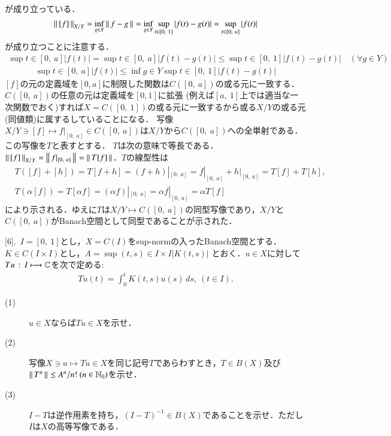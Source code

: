 \begin{prf}
\begin{description}
\begin{align}
		\end{align}
		が成り立っている．
		\begin{align}
			\left\|\, [f]\, \right\|_{X/Y} = \operatorname*{inf}_{g \in Y} \left\|\, f - g\, \right\|_{} = \operatorname*{inf}_{g \in Y} \operatorname*{sup}_{t \in [0,\ 1]} |f(t) - g(t)| = \operatorname*{sup}_{t \in [0,\ a]} |f(t)|
		\end{align}
		が成り立つことに注意する．
		\begin{align}
			\sup{t \in [0,\ a]}{|f(t)|} = \sup{t \in [0,\ a]}{|f(t) - g(t)|} \leq \sup{t \in [0,\ 1]}{|f(t) - g(t)|}\quad (\forall g \in Y)
		\end{align}
		\begin{align}
			\sup{t \in [0,\ a]}{|f(t)|} \leq \inf{g \in Y}{\sup{t \in [0,\ 1]}{|f(t) - g(t)|}}
		\end{align}
		$[f]$の元の定義域を$[0,a]$に制限した関数は$C([0,\ a])$の或る元に一致する．$C([0,\ a])$の任意の元は定義域を$[0,1]$に拡張
		(例えば$[a,\ 1]$上では適当な一次関数でおく)すれば$X=C([0,\ 1])$の或る元に一致するから或る$X/Y$の或る元(同値類)に属するしていることになる．
		写像$X/Y \ni [f] \longmapsto f|_{[0,\ a]} \in C([0,\ a])$は$X/Y$から$C([0,\ a])$への全単射である．この写像を$T$と表すとする．
		$T$は次の意味で等長である．$\left\|\, [f]\, \right\|_{X/Y} = \left\|\, f|_{[0,\ a]}\, \right\|_{} = \left\|\, T[f]\, \right\|_{}$．$T$の線型性は
		\begin{align}
			&T([f] + [h]) = T[f+h] = (f+h)|_{[0,\ a]} = f|_{[0,\ a]} + h|_{[0,\ a]} = T[f] + T[h], \\
			&T(\alpha[f]) = T[\alpha f] = (\alpha f)|_{[0,\ a]} = \alpha f|_{[0,\ a]} = \alpha T[f]
		\end{align}
		により示される．ゆえに$T$は$X/Y \longmapsto C([0,\ a])$の同型写像であり，$X/Y$と$C([0,\ a])$がBanach空間として同型であることが示された．
		\QED
\end{description}
\end{prf}

[6].\ $I=[0,\ 1]$とし，$X=C(I)$をsup-normの入ったBanach空間とする．$K \in C(I \times I)$とし，$A = \sup{(t,s)\in I \times I}{|K(t,s)|}$
とおく．$u \in X$に対して$Tu\, :\, I \longmapsto \mathbb{C}$を次で定める:
\begin{align}
	Tu(t) = \int_{0}^{t} K(t,s)u(s)\, ds,\ (t \in I).
\end{align}
\begin{description}
	\item[(1)] $u \in X$ならば$Tu \in X$を示せ．
	\item[(2)] 写像$X \ni u \longmapsto Tu \in X$を同じ記号$T$であらわすとき，$T \in B(X)$及び$\left\|\, T^n\, \right\|_{} \leq A^n/n!\ (n \in \mathbb{N}_0)$を示せ．
	\item[(3)] $I-T$は逆作用素を持ち，$(I-T)^{-1} \in B(X)$であることを示せ．ただし$I$は$X$の高等写像である．
\end{description}

